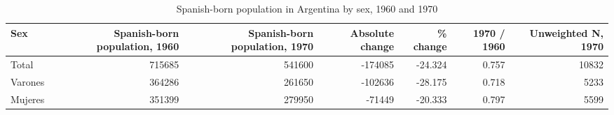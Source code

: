 \begin{table}

\caption{Spanish-born population in Argentina by sex, 1960 and 1970}
\centering
\begin{tabular}[t]{lrrrrrr}
\toprule
Sex & Spanish-born population, 1960 & Spanish-born population, 1970 & Absolute change & \% change & 1970 / 1960 & Unweighted N, 1970\\
\midrule
Total & 715685 & 541600 & -174085 & -24.324 & 0.757 & 10832\\
Varones & 364286 & 261650 & -102636 & -28.175 & 0.718 & 5233\\
Mujeres & 351399 & 279950 & -71449 & -20.333 & 0.797 & 5599\\
\bottomrule
\end{tabular}
\end{table}
